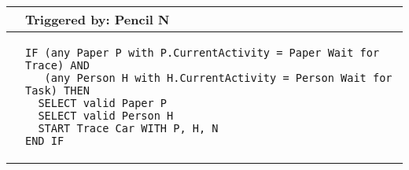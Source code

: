 \begin{longtable}{@{}>{\raggedright\arraybackslash}p{0.25cm}>{\raggedright\arraybackslash}p{13cm}@{}}
  \toprule
   & Triggered by: Pencil N\\ \midrule 
  &
\begin{lstlisting}[language=CMPseudo]
IF (any Paper P with P.CurrentActivity = Paper Wait for Trace) AND
   (any Person H with H.CurrentActivity = Person Wait for Task) THEN
  SELECT valid Paper P
  SELECT valid Person H
  START Trace Car WITH P, H, N
END IF
\end{lstlisting}
  \\ \bottomrule
  \end{longtable}